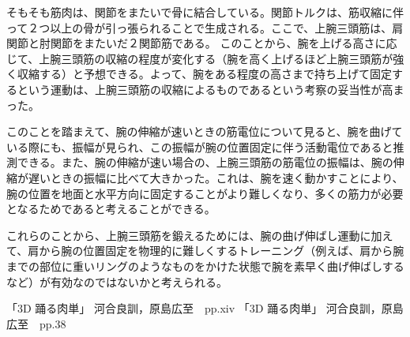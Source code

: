 \documentclass{jsarticle}
\begin{document}
そもそも筋肉は、関節をまたいで骨に結合している。関節トルクは、筋収縮に伴って２つ以上の骨が引っ張られることで生成される。ここで、上腕三頭筋は、肩関節と肘関節をまたいだ２関節筋である\cite{reference2}。
このことから、腕を上げる高さに応じて、上腕三頭筋の収縮の程度が変化する（腕を高く上げるほど上腕三頭筋が強く収縮する）と予想できる。よって、腕をある程度の高さまで持ち上げて固定するという運動は、上腕三頭筋の収縮によるものであるという考察の妥当性が高まった。

このことを踏まえて、腕の伸縮が速いときの筋電位について見ると、腕を曲げている際にも、振幅が見られ、この振幅が腕の位置固定に伴う活動電位であると推測できる。また、腕の伸縮が速い場合の、上腕三頭筋の筋電位の振幅は、腕の伸縮が遅いときの振幅に比べて大きかった。これは、腕を速く動かすことにより、腕の位置を地面と水平方向に固定することがより難しくなり、多くの筋力が必要となるためであると考えることができる。

これらのことから、上腕三頭筋を鍛えるためには、腕の曲げ伸ばし運動に加えて、肩から腕の位置固定を物理的に難しくするトレーニング（例えば、肩から腕までの部位に重いリングのようなものをかけた状態で腕を素早く曲げ伸ばしするなど）が有効なのではないかと考えられる。

\begin{thebibliography}{9}
	 「3D 踊る肉単」 河合良訓，原島広至　pp.xiv
	 「3D 踊る肉単」 河合良訓，原島広至　pp.38
\end{thebibliography}
\end{document}
